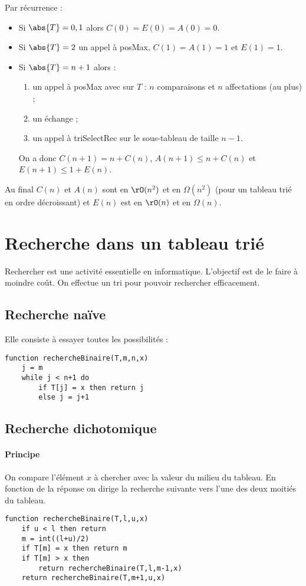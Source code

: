 \documentclass{mybourbaki}
\begin{document}
Par récurrence :
\begin{itemize}
\item Si $\abs{T}= 0,1$ alors $C(0) = E(0) = A(0) = 0$.
\item Si $\abs{T} = 2$ un appel à posMax, $C(1) = A(1) = 1$ et $E(1) = 1$.
\item Si $\abs{T} = n+1$ alors :
 \begin{enumerate}
 \item un appel à posMax avec sur $T$ : $n$ comparaisons et $n$ affectations (au plus) ;
 \item un échange ;
 \item un appel à triSelectRec sur le sous-tableau de taille $n-1$.
 \end{enumerate}
 On a donc $C(n+1) = n+C(n)$, $A(n+1) \leq n + C(n)$ et $E(n+1) \leq 1 + E(n)$.
\end{itemize}
Au final $C(n)$ et $A(n)$ sont en $\rO(n^{2})$ et en $\Omega(n^{2})$ (pour un tableau trié en ordre décroissant) et $E(n)$ est en $\rO(n)$ et en $\Omega(n)$.

\section{Recherche dans un tableau trié}
Rechercher est une activité essentielle en informatique. L'objectif est de le faire à moindre coût. On effectue un tri pour pouvoir rechercher efficacement.

\subsection{Recherche naïve}
Elle consiste à essayer toutes les possibilités :
\begin{lstlisting}
function rechercheBinaire(T,m,n,x)
	j = m
	while j < n+1 do
		if T[j] = x then return j
		else j = j+1
\end{lstlisting}

\subsection{Recherche dichotomique}
\paragraph{Principe}On compare l'élément $x$ à chercher avec la valeur du milieu du tableau. En fonction de la réponse on dirige la recherche suivante vers l'une des deux moitiés du tableau.

\begin{lstlisting}
function rechercheBinaire(T,l,u,x)
	if u < l then return
	m = int((l+u)/2)
	if T[m] = x then return m
	if T[m] > x then
		return rechercheBinaire(T,l,m-1,x)
	return rechercheBinaire(T,m+1,u,x)	
\end{lstlisting}
\end{document}
